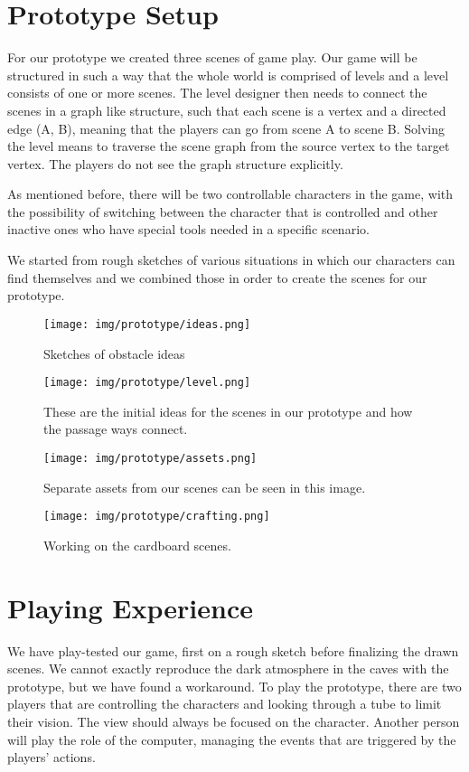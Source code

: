 \section{Prototype Setup}
For our prototype we created three scenes of game play. Our game will be structured in such a way that the whole world is comprised of levels and a level consists of one or more scenes. The level designer then needs to connect the scenes in a graph like structure, such that each scene is a vertex and a directed edge (A, B), meaning that the players can go from scene A to scene B. Solving the level means to traverse the scene graph from the source vertex to the target vertex. The players do not see the graph structure explicitly.

	As mentioned before, there will be two controllable characters in the game, with the possibility of switching between the character that is controlled and other inactive ones who have special tools needed in a specific scenario. 
	
	We started from rough sketches of various situations in which our characters can find themselves and we combined those in order to create the scenes for our prototype. 
	
	\begin{figure}
	\centering
	\texttt{[image: img/prototype/ideas.png]}
	\caption{Sketches of obstacle ideas}
	\end{figure}

	\begin{figure}
	\centering
	\texttt{[image: img/prototype/level.png]}
	\caption{These are the initial ideas for the scenes in our prototype and how the passage ways connect.}
	\end{figure}
	
	\begin{figure}
	\centering
	\texttt{[image: img/prototype/assets.png]}
	\caption{Separate assets from our scenes can be seen in this image.}
	\end{figure}
	
	\begin{figure}
	\centering
	\texttt{[image: img/prototype/crafting.png]}
	\caption{Working on the cardboard scenes.}
	\end{figure}
	

\section{Playing Experience}
We have play-tested our game, first on a rough sketch before finalizing the drawn scenes. We cannot exactly reproduce the dark atmosphere in the caves with the prototype, but we have found a workaround.
To play the prototype, there are two players that are controlling the characters and looking through a tube to limit their vision. The view should always be focused on the character. Another person will play the role of the computer, managing the events that are triggered by the players' actions. 

